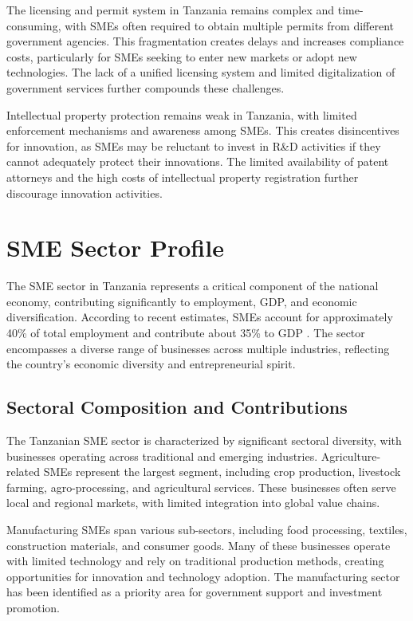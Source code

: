 \documentclass[12pt,a4paper]{article}
\begin{document}
The licensing and permit system in Tanzania remains complex and time-consuming, with SMEs often required to obtain multiple permits from different government agencies. This fragmentation creates delays and increases compliance costs, particularly for SMEs seeking to enter new markets or adopt new technologies. The lack of a unified licensing system and limited digitalization of government services further compounds these challenges.

Intellectual property protection remains weak in Tanzania, with limited enforcement mechanisms and awareness among SMEs. This creates disincentives for innovation, as SMEs may be reluctant to invest in R\&D activities if they cannot adequately protect their innovations. The limited availability of patent attorneys and the high costs of intellectual property registration further discourage innovation activities.

\section{SME Sector Profile}

The SME sector in Tanzania represents a critical component of the national economy, contributing significantly to employment, GDP, and economic diversification. According to recent estimates, SMEs account for approximately 40\% of total employment and contribute about 35\% to GDP \cite{tanzania2019sme}. The sector encompasses a diverse range of businesses across multiple industries, reflecting the country's economic diversity and entrepreneurial spirit.

\subsection{Sectoral Composition and Contributions}

The Tanzanian SME sector is characterized by significant sectoral diversity, with businesses operating across traditional and emerging industries. Agriculture-related SMEs represent the largest segment, including crop production, livestock farming, agro-processing, and agricultural services. These businesses often serve local and regional markets, with limited integration into global value chains.

Manufacturing SMEs span various sub-sectors, including food processing, textiles, construction materials, and consumer goods. Many of these businesses operate with limited technology and rely on traditional production methods, creating opportunities for innovation and technology adoption. The manufacturing sector has been identified as a priority area for government support and investment promotion.
\end{document}
